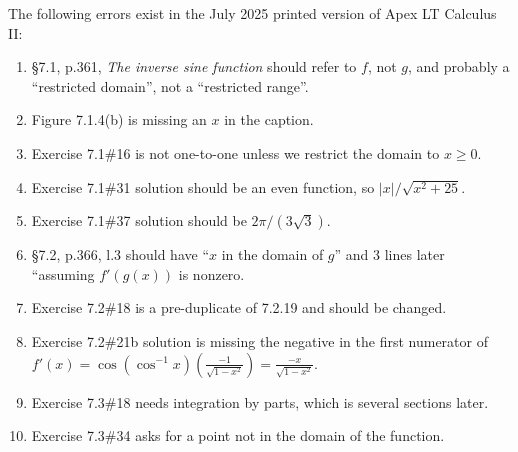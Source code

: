 \documentclass{amsart}
\newcommand{\abs}[1]{\left\lvert#1\right\rvert}
\begin{document}
The following errors exist in the July 2025 printed version of Apex LT Calculus II:
\begin{enumerate}
\addtocounter{enumi}{-1}
\label{2025-07III}
\item \S7.1, p.361, \emph{The inverse sine function} should refer to $f$, not $g$, and probably a ``restricted domain'', not a ``restricted range''.
\item Figure 7.1.4(b) is missing an $x$ in the caption.
\item Exercise 7.1\#16 is not one-to-one unless we restrict the domain to $x\ge 0$.
\item Exercise 7.1\#31 solution should be an even function, so $\abs x/\sqrt{x^2+25}$.
\item Exercise 7.1\#37 solution should be $2\pi/(3\sqrt3)$.
\item \S7.2, p.366, l.3 should have ``$x$ in the domain of $g$'' and 3 lines later ``assuming $f'(g(x))$ is nonzero.
\item Exercise 7.2\#18 is a pre-duplicate of 7.2.19 and should be changed.  %
\item Exercise 7.2\#21b solution is missing the negative in the first numerator of $f'(x) = \cos (\cos^{-1}x)(\frac{-1}{\sqrt{1-x^2}}) =\frac{-x}{\sqrt{1-x^2}}$.
\item Exercise 7.3\#18 needs integration by parts, which is several sections later.  %
\item Exercise 7.3\#34 asks for a point not in the domain of the function.
\label{2025-07II}
\end{enumerate}
\end{document}

